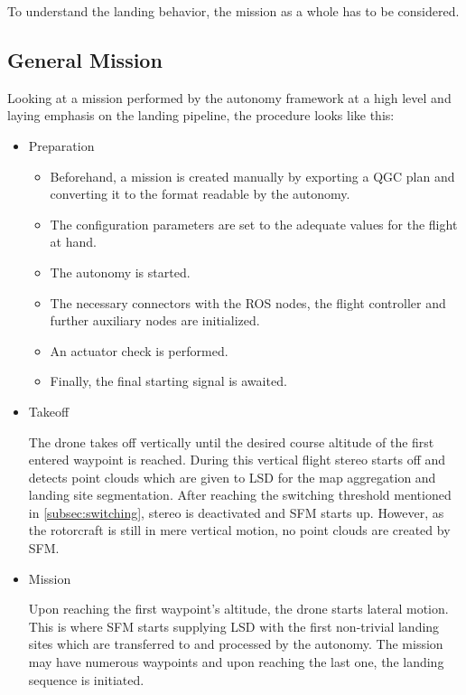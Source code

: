 To understand the landing behavior, the mission as a whole has to be considered.

\subsection{General Mission}

Looking at a mission performed by the autonomy framework at a high level and laying emphasis on the landing pipeline, the procedure looks like this:

\begin{itemize}
    \item Preparation
    
        \begin{itemize}
            \item Beforehand, a mission is created manually by exporting a QGC plan and converting it to the format readable by the autonomy.
            \item The configuration parameters are set to the adequate values for the flight at hand.
            \item The autonomy is started.
            \item The necessary connectors with the ROS nodes, the flight controller and further auxiliary nodes are initialized.
            \item An actuator check is performed.
            \item Finally, the final starting signal is awaited.
        \end{itemize}
        

    \item Takeoff
    
    The drone takes off vertically until the desired course altitude of the first entered waypoint is reached. During this vertical flight stereo starts off and detects point clouds which are given to LSD for the map aggregation and landing site segmentation. After reaching the switching threshold mentioned in \cref{subsec:switching}, stereo is deactivated and SFM starts up. However, as the rotorcraft is still in mere vertical motion, no point clouds are created by SFM.

    \item Mission

    Upon reaching the first waypoint's altitude, the drone starts lateral motion. This is where SFM starts supplying LSD with the first non-trivial landing sites which are transferred to and processed by the autonomy. The mission may have numerous waypoints and upon reaching the last one, the landing sequence is initiated.


\end{itemize}
